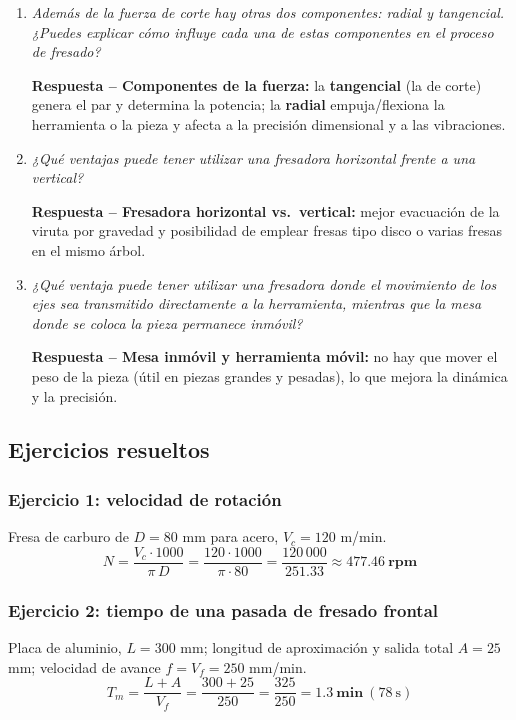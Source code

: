 \documentclass[12pt,a4paper]{article}
\begin{document}
\begin{enumerate}
	      \textbf{Respuesta -- Rugosidad:} la secuencia de golpes de los filos
	      deja una marca
	      por cada avance por filo; la rugosidad aumenta con el avance por filo
	      $f_z$ (y
	      disminuye con el radio de punta). El parámetro más influyente es el
	      \textbf{avance por filo} $f_z$.
	\item \textit{Además de la fuerza de corte hay otras dos componentes: radial y
		      tangencial. ¿Puedes explicar cómo influye cada una de estas
		      componentes en el
		      proceso de fresado?}\par
	      \textbf{Respuesta -- Componentes de la fuerza:} la \textbf{tangencial}
	      (la de corte)
	      genera el par y determina la potencia; la \textbf{radial}
	      empuja/flexiona la
	      herramienta o la pieza y afecta a la precisión dimensional y a las
	      vibraciones.
	\item \textit{¿Qué ventajas puede tener utilizar una fresadora horizontal
		      frente a una vertical?}\par
	      \textbf{Respuesta -- Fresadora horizontal vs.\ vertical:} mejor
	      evacuación de la
	      viruta por gravedad y posibilidad de emplear fresas tipo disco o varias
	      fresas
	      en el mismo árbol.
	\item \textit{¿Qué ventaja puede tener utilizar una fresadora donde el
		      movimiento de los ejes sea transmitido directamente a la herramienta,
		      mientras
		      que la mesa donde se coloca la pieza permanece inmóvil?}\par
	      \textbf{Respuesta -- Mesa inmóvil y herramienta móvil:} no hay que mover
	      el peso de
	      la pieza (útil en piezas grandes y pesadas), lo que mejora la dinámica y
	      la
	      precisión.
\end{enumerate}

\subsection{Ejercicios resueltos}

\subsubsection*{Ejercicio 1: velocidad de rotación}
Fresa de carburo de $D = 80$ mm para acero, $V_c = 120$ m/min.
\[ N = \frac{V_c\cdot 1000}{\pi\, D} = \frac{120\cdot 1000}{\pi\cdot 80} =
	\frac{120\,000}{251.33} \approx \mathbf{477.46\ rpm} \]

\subsubsection*{Ejercicio 2: tiempo de una pasada de fresado frontal}
Placa de aluminio, $L = 300$ mm; longitud de aproximación y salida total $A =
	25$ mm; velocidad de avance $f = V_f = 250$ mm/min.
\[ T_m = \frac{L + A}{V_f} = \frac{300 + 25}{250} = \frac{325}{250} =
	\mathbf{1.3\ min}\ (78\ \text{s}) \]
\end{document}
